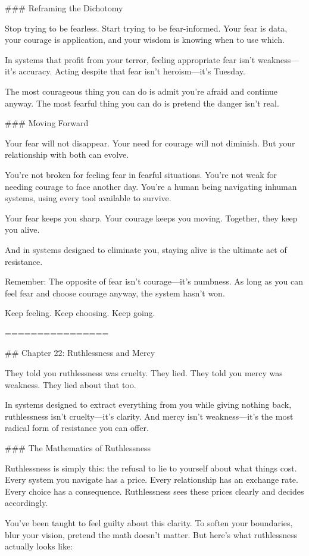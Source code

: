 \documentclass[12pt]{book}
\begin{document}
\#\#\# Reframing the Dichotomy

Stop trying to be fearless. Start trying to be fear-informed. Your fear is data, your courage is application, and your wisdom is knowing when to use which.

In systems that profit from your terror, feeling appropriate fear isn't weakness—it's accuracy. Acting despite that fear isn't heroism—it's Tuesday.

The most courageous thing you can do is admit you're afraid and continue anyway. The most fearful thing you can do is pretend the danger isn't real.

\#\#\# Moving Forward

Your fear will not disappear. Your need for courage will not diminish. But your relationship with both can evolve.

You're not broken for feeling fear in fearful situations. You're not weak for needing courage to face another day. You're a human being navigating inhuman systems, using every tool available to survive.

Your fear keeps you sharp. Your courage keeps you moving. Together, they keep you alive.

And in systems designed to eliminate you, staying alive is the ultimate act of resistance.

Remember: The opposite of fear isn't courage—it's numbness. As long as you can feel fear and choose courage anyway, the system hasn't won.

Keep feeling. Keep choosing. Keep going.

================

\#\# Chapter 22: Ruthlessness and Mercy

They told you ruthlessness was cruelty. They lied. They told you mercy was weakness. They lied about that too.

In systems designed to extract everything from you while giving nothing back, ruthlessness isn't cruelty—it's clarity. And mercy isn't weakness—it's the most radical form of resistance you can offer.

\#\#\# The Mathematics of Ruthlessness

Ruthlessness is simply this: the refusal to lie to yourself about what things cost. Every system you navigate has a price. Every relationship has an exchange rate. Every choice has a consequence. Ruthlessness sees these prices clearly and decides accordingly.

You've been taught to feel guilty about this clarity. To soften your boundaries, blur your vision, pretend the math doesn't matter. But here's what ruthlessness actually looks like:
\end{document}
